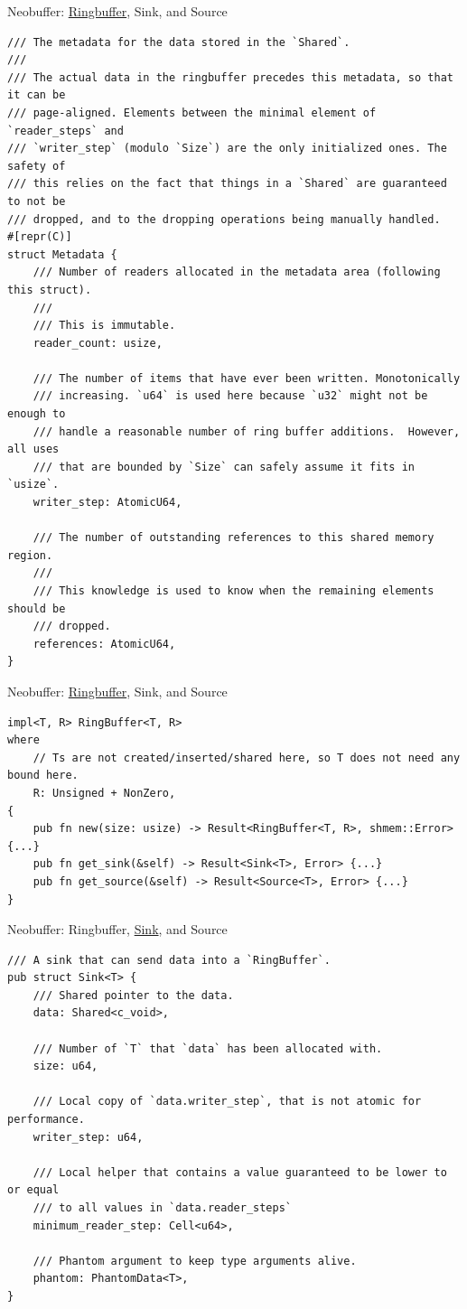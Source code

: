 \documentclass[aspectratio=43]{beamer}
\begin{document}
\begin{frame}[fragile]{Neobuffer: \underline{Ringbuffer}, Sink, and Source}
    \begin{verbatim}
/// The metadata for the data stored in the `Shared`.
///
/// The actual data in the ringbuffer precedes this metadata, so that it can be
/// page-aligned. Elements between the minimal element of `reader_steps` and
/// `writer_step` (modulo `Size`) are the only initialized ones. The safety of
/// this relies on the fact that things in a `Shared` are guaranteed to not be
/// dropped, and to the dropping operations being manually handled.
#[repr(C)]
struct Metadata {
    /// Number of readers allocated in the metadata area (following this struct).
    ///
    /// This is immutable.
    reader_count: usize,

    /// The number of items that have ever been written. Monotonically
    /// increasing. `u64` is used here because `u32` might not be enough to
    /// handle a reasonable number of ring buffer additions.  However, all uses
    /// that are bounded by `Size` can safely assume it fits in `usize`.
    writer_step: AtomicU64,

    /// The number of outstanding references to this shared memory region.
    ///
    /// This knowledge is used to know when the remaining elements should be
    /// dropped.
    references: AtomicU64,
}
    \end{verbatim}
\end{frame}

\begin{frame}[fragile]{Neobuffer: \underline{Ringbuffer}, Sink, and Source}
    \begin{verbatim}
impl<T, R> RingBuffer<T, R>
where
    // Ts are not created/inserted/shared here, so T does not need any bound here.
    R: Unsigned + NonZero,
{
    pub fn new(size: usize) -> Result<RingBuffer<T, R>, shmem::Error> {...}
    pub fn get_sink(&self) -> Result<Sink<T>, Error> {...}
    pub fn get_source(&self) -> Result<Source<T>, Error> {...}
}
    \end{verbatim}
\end{frame}

\begin{frame}[fragile]{Neobuffer: Ringbuffer, \underline{Sink}, and Source}
    \begin{verbatim}
/// A sink that can send data into a `RingBuffer`.
pub struct Sink<T> {
    /// Shared pointer to the data.
    data: Shared<c_void>,

    /// Number of `T` that `data` has been allocated with.
    size: u64,

    /// Local copy of `data.writer_step`, that is not atomic for performance.
    writer_step: u64,

    /// Local helper that contains a value guaranteed to be lower to or equal
    /// to all values in `data.reader_steps`
    minimum_reader_step: Cell<u64>,

    /// Phantom argument to keep type arguments alive.
    phantom: PhantomData<T>,
}
    \end{verbatim}
\end{frame}
\end{document}
